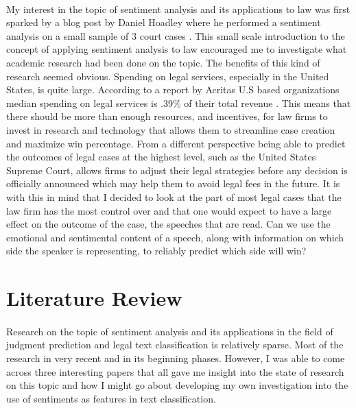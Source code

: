 \documentclass[12pt,english]{article}
\begin{document}
\paragraph{}
My interest in the topic of sentiment analysis and its applications to law was first sparked by a blog post by Daniel Hoadley where he performed a sentiment analysis on a small sample of 3 court cases \citep{hoadley_daniel_sentiment_2017}. This small scale introduction to the concept of applying sentiment analysis to law encouraged me to investigate what academic research had been done on the topic. The benefits of this kind of research seemed obvious. Spending on legal services, especially in the United States, is quite large. According to a report by Acritas U.S based organizations median spending on legal services is .39\% of their total revenue \citep{Acritas_free_reports_2017}. This means that there should be more than enough resources, and incentives, for law firms to invest in research and technology that allows them to streamline case creation and maximize win percentage. From a different perspective being able to predict the outcomes of legal cases at the highest level, such as the United States Supreme Court, allows firms to adjust their legal strategies before any decision is officially announced which may help them to avoid legal fees in the future. It is with this in mind that I decided to look at the part of most legal cases that the law firm has the most control over and that one would expect to have a large effect on the outcome of the case, the speeches that are read. Can we use the emotional and sentimental content of a speech, along with information on which side the speaker is representing, to reliably predict which side will win?

\section{Literature Review}
\paragraph{}
Research on the topic of sentiment analysis and its applications in the field of judgment prediction and legal text classification is relatively sparse. Most of the research in very recent and in its beginning phases. However, I was able to come across three interesting papers that all gave me insight into the state of research on this topic and how I might go about developing my own investigation into the use of sentiments as features in text classification. 
\end{document}
